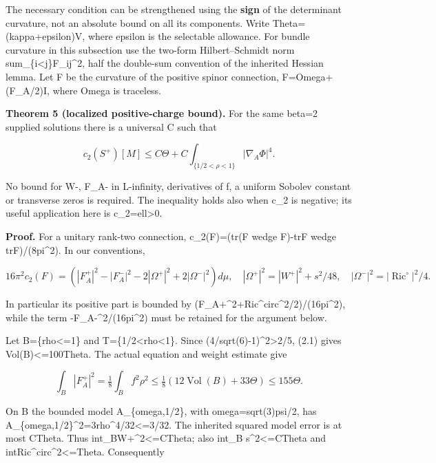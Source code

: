 \documentclass[
  10pt,
]{article}
\begin{document}
The necessary condition can be strengthened using the \textbf{sign} of
the determinant curvature, not an absolute bound on all its components.
Write Theta=(kappa+epsilon)V, where epsilon is the selectable allowance.
For bundle curvature in this subsection use the two-form
Hilbert--Schmidt norm sum\_\{i\textless j\}\textbar F\_ij\textbar\^{}2,
half the double-sum convention of the inherited Hessian lemma. Let F be
the curvature of the positive spinor connection, F=Omega+(F\_A/2)I,
where Omega is traceless.

\textbf{Theorem 5 (localized positive-charge bound).} For the same
beta=2 supplied solutions there is a universal C such that

\[
 \boxed{c_2(S^+)[M]\le C\Theta+
               C\int_{\{1/2<\rho<1\}}|\nabla_A\Phi|^4.} \tag{4.3}
\]

No bound for W-, F\_A- in L-infinity, derivatives of f, a uniform
Sobolev constant or transverse zeros is required. The inequality holds
also when c\_2 is negative; its useful application here is
c\_2=ell\textgreater0.

\textbf{Proof.} For a unitary rank-two connection, c\_2(F)=(tr(F wedge
F)-trF wedge trF)/(8pi\^{}2). In our conventions,

\[
 16\pi^2 c_2(F)=\left(|F_A^+|^2-|F_A^-|^2
                 -2|\Omega^+|^2+2|\Omega^-|^2\right)d\mu,
 \quad |\Omega^+|^2=|W^+|^2+s^2/48,\quad
 |\Omega^-|^2=|\operatorname{Ric}^\circ|^2/4.            \tag{4.4}
\]

In particular its positive part is bounded by
(\textbar F\_A+\textbar\^{}2+\textbar Ric\^{}circ\textbar\^{}2/2)/(16pi\^{}2),
while the term -\textbar F\_A-\textbar\^{}2/(16pi\^{}2) must be retained
for the argument below.

Let B=\{rho\textless=1\} and T=\{1/2\textless rho\textless1\}. Since
(4/sqrt(6)-1)\^{}2\textgreater2/5, (2.1) gives Vol(B)\textless=100Theta.
The actual equation and weight estimate give

\[
 \int_B|F_A^+|^2=\tfrac18\int_B f^2\rho^2
       \le\tfrac18(12\operatorname{Vol}(B)+33\Theta)
       \le155\Theta.                                  \tag{4.5}
\]

On B the bounded model A\_\{omega,1/2\}, with omega=sqrt(3)psi/2, has
\textbar A\_\{omega,1/2\}\textbar\^{}2=3rho\^{}4/32\textless=3/32. The
inherited squared model error is at most CTheta. Thus
int\_B\textbar W+\textbar\^{}2\textless=CTheta; also int\_B
s\^{}2\textless=CTheta and
int\textbar Ric\^{}circ\textbar\^{}2\textless=Theta. Consequently
\end{document}
